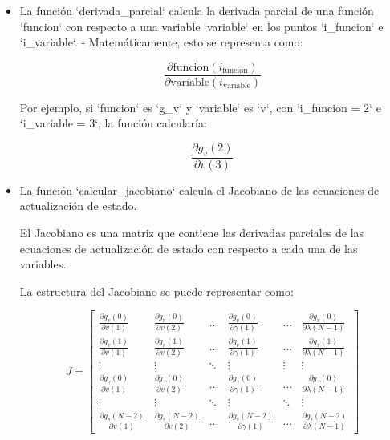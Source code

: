 \documentclass[fleqn]{article}
\begin{document}
\begin{itemize}
    \item La función `derivada\_parcial` calcula la derivada parcial de una función `funcion` con respecto a una variable `variable` en los puntos `i\_funcion` e `i\_variable`. 
    - Matemáticamente, esto se representa como:
    
    $$
    \frac{\partial \text{funcion}(i_\text{funcion})}{\partial \text{variable}(i_\text{variable})}
    $$
    
    Por ejemplo, si `funcion` es `g\_v` y `variable` es `v`, con `i\_funcion = 2` e `i\_variable = 3`, la función calcularía:
    
    $$\frac{\partial g_v(2)}{\partial v(3)}$$
    
    \item La función `calcular\_jacobiano` calcula el Jacobiano de las ecuaciones de actualización de estado. 

    El Jacobiano es una matriz que contiene las derivadas parciales de las ecuaciones de actualización de estado con respecto a cada una de las variables. 
    
    La estructura del Jacobiano se puede representar como:

    \begin{equation}
    J = \begin{bmatrix}
    \frac{\partial g_v(0)}{\partial v(1)} & \frac{\partial g_v(0)}{\partial v(2)} & \dots & \frac{\partial g_v(0)}{\partial \gamma(1)} & \dots & \frac{\partial g_v(0)}{\partial \lambda(N-1)} \\
    
    \frac{\partial g_v(1)}{\partial v(1)} & \frac{\partial g_v(1)}{\partial v(2)} & \dots & \frac{\partial g_v(1)}{\partial \gamma(1)} & \dots & \frac{\partial g_v(1)}{\partial \lambda(N-1)} \\
    
    \vdots & \vdots & \ddots & \vdots & \vdots & \vdots\\
    
    \frac{\partial g_\gamma(0)}{\partial v(1)} & \frac{\partial g_\gamma(0)}{\partial v(2)} &  
    \dots & \frac{\partial g_\gamma(0)}{\partial \gamma(1)} & \dots & \frac{\partial g_\gamma(0)}{\partial \lambda(N-1)} \\
    
    \vdots & \vdots & \ddots & \vdots & \ddots & \vdots \\
    
    \frac{\partial g_s(N-2)}{\partial v(1)} & \frac{\partial g_s(N-2)}{\partial v(2)} & \dots & \frac{\partial g_s(N-2)}{\partial \gamma(1)} & \dots & \frac{\partial g_s(N-2)}{\partial \lambda(N-1)}
    \end{bmatrix}\end{equation}
    

\end{itemize}
\end{document}
